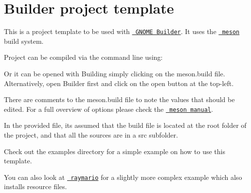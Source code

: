 \chapter{Builder project template}
\hypertarget{md__2home_2giangvu_2CPPprog_2raylib-tetris_2build_2external_2raylib-master_2projects_2Builder_2README}{}\label{md__2home_2giangvu_2CPPprog_2raylib-tetris_2build_2external_2raylib-master_2projects_2Builder_2README}
\label{md__2home_2giangvu_2CPPprog_2raylib-tetris_2build_2external_2raylib-master_2projects_2Builder_2README_autotoc_md71}%
%
 This is a project template to be used with \href{https://raw.githubusercontent.com/jubalh/raymario/master/meson.build}{\texttt{ GNOME Builder}}. It uses the \href{https://raw.githubusercontent.com/jubalh/raymario/master/meson.build}{\texttt{ meson}} build system.

Project can be compiled via the command line using\+: 
\begin{DoxyCode}{0}

\end{DoxyCode}


Or it can be opened with Building simply clicking on the {\ttfamily meson.\+build} file. Alternatively, open Builder first and click on the {\ttfamily open} button at the top-\/left.

There are comments to the {\ttfamily meson.\+build} file to note the values that should be edited. For a full overview of options please check the \href{http://mesonbuild.com/Manual.html}{\texttt{ meson manual}}.

In the provided file, it\textquotesingle{}s assumed that the build file is located at the root folder of the project, and that all the sources are in a {\ttfamily src} subfolder.

Check out the {\ttfamily examples} directory for a simple example on how to use this template.

You can also look at \href{https://github.com/jubalh/raymario}{\texttt{ raymario}} for a slightly more complex example which also installs resource files. 